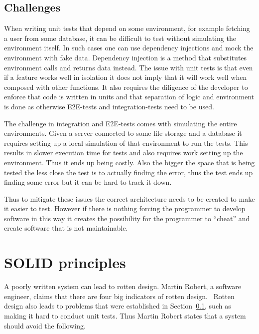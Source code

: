 \subsection{Challenges}\label{challenges}

When writing unit tests that depend on some environment, for example fetching a
user from some database, it can be difficult to test without simulating the
environment itself. In such cases one can use dependency injections and mock the
environment with fake data. Dependency injection is a method that substitutes
environment calls and returns data instead. The issue with unit tests is that
even if a feature works well in isolation it does not imply that it will work
well when composed with other functions. It also requires the diligence of the
developer to enforce that code is written in units and that separation of logic
and environment is done as otherwise E2E-tests and integration-tests need to be
used.

The challenge in integration and E2E-tests comes with simulating the entire
environments. Given a server connected to some file storage and a database it
requires setting up a local simulation of that environment to run the tests.
This results in slower execution time for tests and also requires work setting
up the environment. Thus it ends up being costly. Also the bigger the space
that is being tested the less close the test is to actually finding the error,
thus the test ends up finding some error but it can be hard to track it down.

Thus to mitigate these issues the correct architecture needs to be created to
make it easier to test. However if there is nothing forcing the programmer to
develop software in this way it creates the possibility for the programmer to
``cheat'' and create software that is not maintainable. 

\section{SOLID principles}\label{oop}

A poorly written system can lead to rotten design. Martin Robert, a software
engineer, claims that there are four big indicators of rotten
design.~\cite{martinrobert} Rotten design also leads to problems that were
established in Section~\ref{challenges}, such as making it hard to conduct unit
tests. Thus Martin Robert states that a system should avoid the following.

